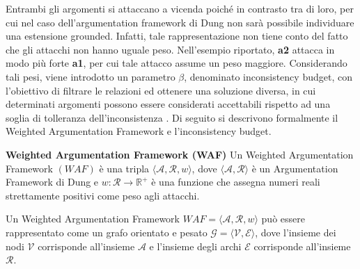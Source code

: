 Entrambi gli argomenti si attaccano a vicenda poiché in contrasto tra di loro, per cui nel caso dell'argumentation framework di Dung non sarà possibile individuare una estensione grounded. Infatti, tale rappresentazione non tiene conto del fatto che gli attacchi non hanno uguale peso. Nell'esempio riportato, \textbf{a2} attacca in modo più forte \textbf{a1}, per cui tale attacco assume un peso maggiore. Considerando tali pesi, viene introdotto un parametro $\beta$, denominato inconsistency budget, con l'obiettivo di filtrare le relazioni ed ottenere una soluzione diversa, in cui determinati argomenti possono essere considerati accettabili rispetto ad una soglia di tolleranza dell'inconsistenza \cite{dunne2011weighted}. Di seguito si descrivono formalmente il Weighted Argumentation Framework e l'inconsistency budget.


\begin{defn} \textbf{Weighted Argumentation Framework (WAF)}
Un Weighted Argumentation Framework $(WAF)$ è una tripla $⟨\mathcal{A}, \mathcal{R}, w⟩$, dove $⟨\mathcal{A}, \mathcal{R}⟩$ è un Argumentation Framework di Dung e $w: \mathcal{R} \rightarrow \mathbb{R}^{+}$ è una funzione che assegna numeri reali strettamente positivi come peso agli attacchi.
\end{defn}

Un Weighted Argumentation Framework $WAF = ⟨\mathcal{A}, \mathcal{R}, w⟩$ può essere rappresentato come un grafo orientato e pesato $\mathcal{G} = ⟨\mathcal{V}, \mathcal{E}⟩$, dove l'insieme dei nodi $\mathcal{V}$ corrisponde all'insieme $\mathcal{A}$ e l'insieme degli archi $\mathcal{E}$ corrisponde all'insieme $\mathcal{R}$.

